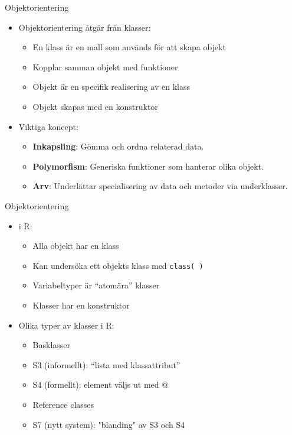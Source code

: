 \documentclass[
  11pt,
  ignorenonframetext,
  handout]{beamer}
\providecommand{\tightlist}{%
  \setlength{\itemsep}{0pt}\setlength{\parskip}{0pt}}
\begin{document}
\begin{frame}{Objektorientering}
\label{objektorientering}
\begin{itemize}
\tightlist
\item
  Objektorientering åtgår från klasser:

  \begin{itemize}
  \tightlist
  \item
    En klass är en mall som används för att skapa objekt
  \item
    Kopplar samman objekt med funktioner
  \item
    Objekt är en specifik realisering av en klass
  \item
    Objekt skapas med en konstruktor
  \end{itemize}
\item
  Viktiga koncept:

  \begin{itemize}
  \tightlist
  \item
    \textbf{Inkapsling}: Gömma och ordna relaterad data.
  \item
    \textbf{Polymorfism}: Generiska funktioner som hanterar olika
    objekt.
  \item
    \textbf{Arv}: Underlättar specialisering av data och metoder via
    underklasser.
  \end{itemize}
\end{itemize}
\end{frame}

\begin{frame}{Objektorientering}
\label{objektorientering-1}
\begin{itemize}
\tightlist
\item
  i R:

  \begin{itemize}
  \tightlist
  \item
    Alla objekt har en klass
  \item
    Kan undersöka ett objekts klass med \texttt{class( )}
  \item
    Variabeltyper är ``atomära'' klasser
  \item
    Klasser har en konstruktor
  \end{itemize}
\item
  Olika typer av klasser i R:

  \begin{itemize}
  \tightlist
  \item
    Basklasser
  \item
    S3 (informellt): ``lista med klassattribut''
  \item
    S4 (formellt): element väljs ut med @
  \item
    Reference classes
  \item
    S7 (nytt system): "blanding" av S3 och S4
  \end{itemize}
\end{itemize}
\end{frame}
\end{document}
